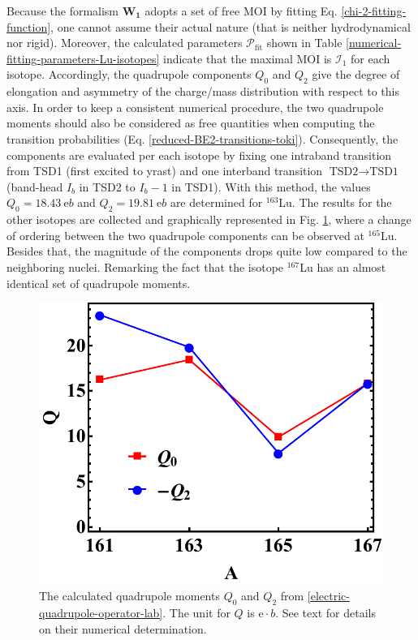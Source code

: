 Because the formalism $\mathbf{W_1}$ adopts a set of free MOI by fitting Eq. \ref{chi-2-fitting-function}, one cannot assume their actual nature (that is neither hydrodynamical nor rigid). Moreover, the calculated parameters $\mathcal{P}_\text{fit}$ shown in Table \ref{numerical-fitting-parameters-Lu-isotopes} indicate that the maximal MOI is $\mathcal{I}_1$ for each isotope. Accordingly, the quadrupole components $Q_{0}$ and $Q_{2}$ give the degree of elongation and asymmetry of the charge/mass distribution with respect to this axis. In order to keep a consistent numerical procedure, the two quadrupole moments should also be considered as free quantities when computing the transition probabilities (Eq. \ref{reduced-BE2-transitions-toki}). Consequently, the components are evaluated per each isotope by fixing one intraband transition from TSD1 (first excited to yrast) and one interband transition $\text{TSD2}\to\text{TSD1}$ (band-head $I_b$ in TSD2 to $I_b-1$ in TSD1). With this method, the values $Q_0=18.43\ \mathrm{e}b$ and $Q_2=19.81\ \mathrm{e}b$ are determined for $^{163}$Lu. The results for the other isotopes are collected and graphically represented in Fig. \ref{quadrupole-moments-fit-numerical-results}, where a change of ordering between the two quadrupole components can be observed at $^{165}$Lu. Besides that, the magnitude of the components drops quite low compared to the neighboring nuclei. Remarking the fact that the isotope $^{167}$Lu has an almost identical set of quadrupole moments.
\begin{figure}
    \centering
    \includegraphics[scale=0.65]{Chapters/Figures/Lu-exp-energies/fig19.pdf}
    \caption{The calculated quadrupole moments $Q_0$ and $Q_2$ from \ref{electric-quadrupole-operator-lab}. The unit for $Q$ is $\mathrm{e}\cdot b$. See text for details on their numerical determination.}
    \label{quadrupole-moments-fit-numerical-results}
\end{figure}

